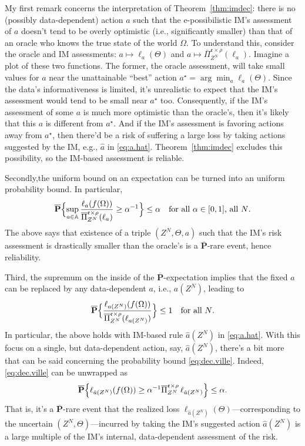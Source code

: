 \documentclass[a4paper, 12pt]{article}
\theoremstyle{plain}
\theoremstyle{definition}
\theoremstyle{remark}
\renewcommand{\AA}{\mathbb{A}}
\newcommand{\uPi}{\overline{\Pi}}
\newcommand{\uuprob}{\mathbf{\overline{P}}}
\newcommand{\eval}{\mathfrak{e}}
\begin{document}
My first remark concerns the interpretation of Theorem~\ref{thm:imdec}: there is no (possibly data-dependent) action $a$ such that the e-possibilistic IM's assessment of $a$ doesn't tend to be overly optimistic (i.e., significantly smaller) than that of an oracle who knows the true state of the world $\Omega$.  To understand this, consider the oracle and IM assessments: $a \mapsto \ell_a(\Theta)$ and $a \mapsto \uPi_{Z^N}^{\eval \times \rho}(\ell_a)$. Imagine a plot of these two functions.  The former, the oracle assessment, will take small values for $a$ near the unattainable ``best'' action $a^\star = \arg\min_a \ell_a(\Theta)$.  Since the data's informativeness is limited, it's unrealistic to expect that the IM's assessment would tend to be small near $a^\star$ too.  Consequently, if the IM's assessment of some $a$ is much more optimistic than the oracle's, then it's likely that this $a$ is different from $a^\star$.  And if the IM's assessment is favoring actions away from $a^\star$, then there'd be a risk of suffering a large loss by taking actions suggested by the IM, e.g., $\hat a$ in \eqref{eq:a.hat}.  Theorem~\ref{thm:imdec} excludes this possibility, so the IM-based assessment is reliable.  

Secondly,the uniform bound on an expectation can be turned into an uniform probability bound.  In particular, 
\begin{equation}
\label{eq:dec.ville}
\uuprob\Bigl\{ \sup_{a \in \AA} \frac{\ell_a(f(\Omega))}{\uPi_{Z^N}^{\eval \times \rho}(\ell_a)} \geq \alpha^{-1} \Bigr\} \leq \alpha \quad \text{for all $\alpha \in [0,1]$, all $N$}. 
\end{equation}
The above says that existence of a triple $(Z^N, \Theta, a)$ such that the IM's risk assessment is drastically smaller than the oracle's is a $\uuprob$-rare event, hence reliability.  

Third, the supremum on the inside of the $\uuprob$-expectation implies that the fixed $a$ can be replaced by any data-dependent $a$, i.e., $a(Z^N)$, leading to 
\[ \uuprob\Bigl\{ \frac{\ell_{a(Z^N)}(f(\Omega))}{\uPi_{Z^N}^{\eval \times \rho}(\ell_{a(Z^N)})} \Bigr\} \leq 1 \quad \text{for all $N$}. \]
In particular, the above holds with IM-based rule $\hat a(Z^N)$ in \eqref{eq:a.hat}.  With this focus on a single, but data-dependent action, say, $\hat a(Z^N)$, there's a bit more that can be said concerning the probability bound \eqref{eq:dec.ville}.  Indeed, \eqref{eq:dec.ville} can be unwrapped as 
\[ \uuprob\Bigl\{ \ell_{\hat a(Z^N)}(f(\Omega)) \geq \alpha^{-1} \uPi_{Z^N}^{\eval \times \rho}\,\ell_{\hat a(Z^N)} \Bigr\} \leq \alpha. \]
That is, it's a $\uuprob$-rare event that the realized loss $\ell_{\hat a(Z^N)}(\Theta)$---corresponding to the uncertain $(Z^N,\Theta)$---incurred by taking the IM's suggested action $\hat a(Z^N)$ is a large multiple of the IM's internal, data-dependent assessment of the risk.  
\end{document}
